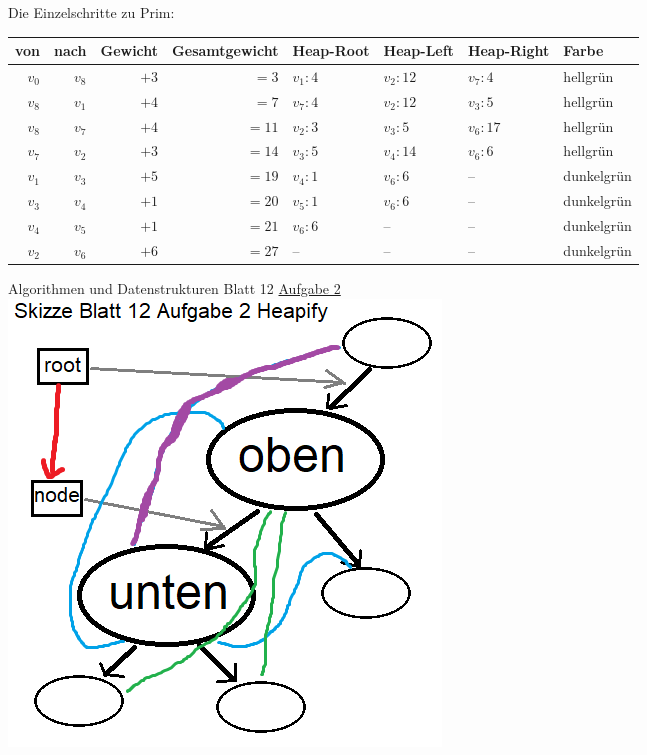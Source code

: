 \documentclass[12pt]{article} %
\newcommand{\aufgabe}[2]{{\LARGE Algorithmen und Datenstrukturen Blatt #1 \underline{Aufgabe #2}}\\[3.5ex]  }
\begin{document}
Die Einzelschritte zu Prim: \\
\begin{tabular}{| r r | r | r | lll | l |}
\hline 
von & nach & Gewicht & Gesamtgewicht & Heap-Root & Heap-Left & Heap-Right & Farbe \\ \hline
$v_{0}$ & $v_{8}$ & $+3$ & $= 3$ & $v_{1}: 4$ & $v_{2}: 12$ & $v_{7}: 4$ & \textcolor{hellgruen}{hellgrün} \\ \hline
$v_{8}$ & $v_{1}$ & $+4$ & $= 7$ & $v_{7}: 4$ & $v_{2}: 12$ & $v_{3}: 5$ & \textcolor{hellgruen}{hellgrün} \\ \hline
$v_{8}$ & $v_{7}$ & $+4$ & $= 11$ & $v_{2}: 3$ & $v_{3}: 5$ & $v_{6}: 17$ & \textcolor{hellgruen}{hellgrün} \\ \hline
$v_{7}$ & $v_{2}$ & $+3$ & $= 14$ & $v_{3}: 5$ & $v_{4}: 14$ & $v_{6}: 6$ & \textcolor{hellgruen}{hellgrün} \\ \hline
$v_{1}$ & $v_{3}$ & $+5$ & $= 19$ & $v_{4}: 1$ & $v_{6}: 6$ & -- & \textcolor{dunkelgruen}{dunkelgrün} \\ \hline
$v_{3}$ & $v_{4}$ & $+1$ & $= 20$ & $v_{5}: 1$ & $v_{6}: 6$ & -- & \textcolor{dunkelgruen}{dunkelgrün} \\ \hline
$v_{4}$ & $v_{5}$ & $+1$ & $= 21$ & $v_{6}: 6$ & -- & -- & \textcolor{dunkelgruen}{dunkelgrün} \\ \hline
$v_{2}$ & $v_{6}$ & $+6$ & $= 27$ & -- & -- & -- & \textcolor{dunkelgruen}{dunkelgrün} \\ \hline
\end{tabular}
\newpage
\aufgabe{12}{2}
\includegraphics{Blatt12A2.png} \\
\end{document}

